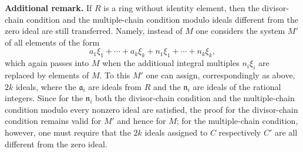 \documentclass[11pt]{article}
\begin{document}
\medskip
\noindent\textbf{Additional remark.} If $R$ is a ring without identity element, then
the divisor-chain condition and the multiple-chain condition modulo ideals different
from the zero ideal are still transferred. Namely, instead of $M$ one considers the
system $M'$ of all elements of the form
\[
        a_1\xi_1+\cdots+a_k\xi_k+n_1\xi_1+\cdots+n_k\xi_k,
\]
which again passes into $M$ when the additional integral multiples $n_i\xi_i$ are
replaced by elements of $M$. To this $M'$ one can assign, correspondingly as
above, $2k$ ideals, where the $\mathfrak a_i$ are ideals from $R$ and the
$\mathfrak n_i$ are ideals of the rational integers. Since for the $\mathfrak n_i$
both the divisor-chain condition and the multiple-chain condition modulo every
nonzero ideal are satisfied, the proof for the divisor-chain condition remains valid
for $M'$ and hence for $M$; for the multiple-chain condition, however, one must
require that the $2k$ ideals assigned to $C$ respectively $C'$ are all different
from the zero ideal.
\end{document}
